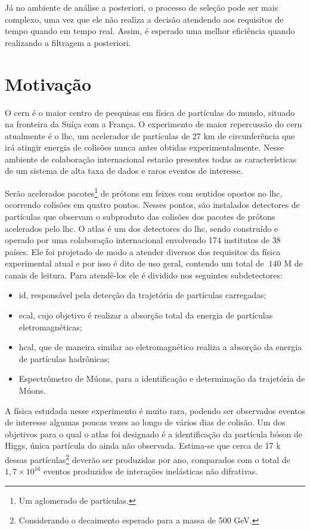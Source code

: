 Já no ambiente de análise a posteriori, o processo de seleção pode ser mais
complexo, uma vez que ele não realiza a decisão atendendo aos
requisitos de tempo quando em tempo real. Assim, é esperado 
uma melhor eficiência quando realizando a filtragem a posteriori.

\section{Motivação}

O \gls{cern} é o maior centro de
pesquisas em física de partículas do mundo, situado na fronteira da Suíça com a
França. O experimento de maior repercussão do \gls{cern} atualmente é o \gls{lhc}, 
um acelerador de partículas de 27 km de
circunferência que irá atingir energia de colisões nunca antes obtidas
experimentalmente. 
Nesse ambiente de colaboração internacional estarão presentes
todas as características de um sistema de alta taxa de dados e raros eventos de
interesse.

Serão acelerados pacotes\footnote{Um aglomerado de partículas.} de prótons em
feixes com sentidos opostos no \gls{lhc},
ocorrendo colisões em quatro pontos. Nesses pontos, são instalados 
detectores de partículas que observam o subproduto das colisões dos pacotes de prótons 
acelerados pelo \gls{lhc}. O \gls{atlas} é um dos detectores do
\gls{lhc}, sendo construído e operado por uma colaboração internacional envolvendo 174 institutos de 38
países. Ele foi projetado de modo a atender diversos dos requisitos da física 
experimental atual e por isso é dito de uso geral, contendo um total de $~140$ M 
de canais de leitura. Para atendê-los ele é dividido nos seguintes subdetectores:

\begin{itemize}
\item \gls{id}, responsável pela detecção da trajetória de partículas carregadas;
\item \gls{ecal}, cujo objetivo é realizar a absorção total da
energia de partículas eletromagnéticas;
\item \gls{hcal}, que de maneira similar ao eletromagnético realiza a
absorção da energia de partículas hadrônicas;
\item Espectrômetro de Múons, para a identificação e determinação da trajetória de
Múons.
\end{itemize}

A física estudada nesse experimento é muito rara, podendo ser observados eventos
de interesse algumas poucas vezes ao longo de vários dias de colisão. 
Um dos objetivos para o qual o \gls{atlas} foi 
designado é a identificação da partícula bóson de Higgs, única partícula 
do  ainda não observada. Estima-se que cerca de 17 k dessas
partículas\footnote{Considerando o decaimento esperado para a massa de 500 GeV.} deverão ser produzidas por ano, comparados
com o total de $1,7\times10^{16}$ eventos produzidos de interações inelásticas
não difrativas. 

